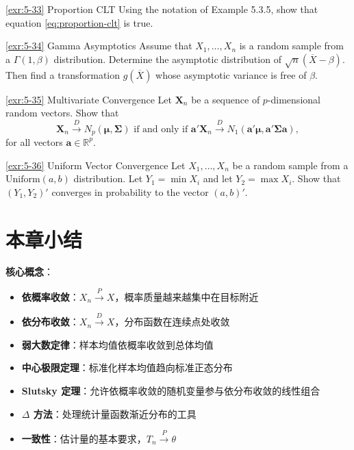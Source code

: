 \begin{exercise}{\ref{exr:5-33} Proportion CLT}\label{exr:5-33}
Using the notation of Example 5.3.5, show that equation \eqref{eq:proportion-clt} is true.
\end{exercise}

\begin{exercise}{\ref{exr:5-34} Gamma Asymptotics}\label{exr:5-34}
Assume that $X_1, \ldots, X_n$ is a random sample from a $\Gamma(1,\beta)$ distribution. Determine the asymptotic distribution of $\sqrt{n}(\overline{X} - \beta)$. Then find a transformation $g(\overline{X})$ whose asymptotic variance is free of $\beta$.
\end{exercise}

\begin{exercise}{\ref{exr:5-35} Multivariate Convergence}\label{exr:5-35}
Let ${\mathbf{X}_n}$ be a sequence of $p$-dimensional random vectors. Show that
\[
\mathbf{X}_n \xrightarrow{D} N_p(\boldsymbol{\mu}, \boldsymbol{\Sigma}) \text{ if and only if } \mathbf{a}'\mathbf{X}_n \xrightarrow{D} N_1(\mathbf{a}'\boldsymbol{\mu}, \mathbf{a}'\boldsymbol{\Sigma}\mathbf{a}),
\]
for all vectors $\mathbf{a} \in \mathbb{R}^p$.
\end{exercise}

\begin{exercise}{\ref{exr:5-36} Uniform Vector Convergence}\label{exr:5-36}
Let $X_1, \ldots, X_n$ be a random sample from a $\mathrm{Uniform}(a,b)$ distribution. Let $Y_1 = \min X_i$ and let $Y_2 = \max X_i$. Show that $(Y_1, Y_2)'$ converges in probability to the vector $(a,b)'$.
\end{exercise}

\section*{本章小结}

\textbf{核心概念}：
\begin{itemize}
\item \textbf{依概率收敛}：$X_n \xrightarrow{P} X$，概率质量越来越集中在目标附近
\item \textbf{依分布收敛}：$X_n \xrightarrow{D} X$，分布函数在连续点处收敛
\item \textbf{弱大数定律}：样本均值依概率收敛到总体均值
\item \textbf{中心极限定理}：标准化样本均值趋向标准正态分布
\item \textbf{Slutsky 定理}：允许依概率收敛的随机变量参与依分布收敛的线性组合
\item \textbf{$\Delta$ 方法}：处理统计量函数渐近分布的工具
\item \textbf{一致性}：估计量的基本要求，$T_n \xrightarrow{P} \theta$
\end{itemize}

